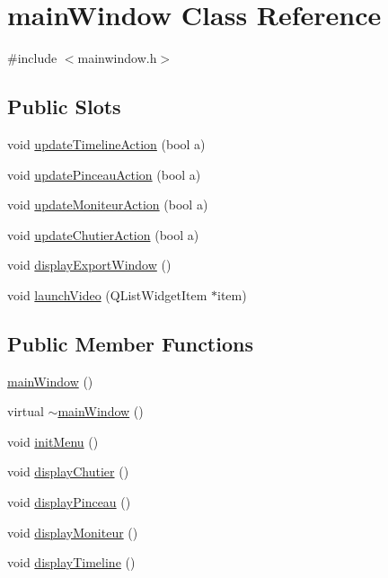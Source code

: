 \hypertarget{classmain_window}{\section{main\-Window \-Class \-Reference}
\label{classmain_window}
}


{\ttfamily \#include $<$mainwindow.\-h$>$}

\subsection*{\-Public \-Slots}
\begin{DoxyCompactItemize}
\item 
void \hyperlink{classmain_window_a1e3b0c0362c7a00799a5b5ed4383ba68}{update\-Timeline\-Action} (bool a)
\item 
void \hyperlink{classmain_window_ad2056d0c69d6c1f1a94286175ac757ae}{update\-Pinceau\-Action} (bool a)
\item 
void \hyperlink{classmain_window_a8743acd4677c3ff95abfa6fd760dab6e}{update\-Moniteur\-Action} (bool a)
\item 
void \hyperlink{classmain_window_a0afa781b310e1b1d008ec054161d6fcb}{update\-Chutier\-Action} (bool a)
\item 
void \hyperlink{classmain_window_a96c52dfe34f45eda1851e4efbbf40702}{display\-Export\-Window} ()
\item 
void \hyperlink{classmain_window_af26494a82495fa6398cb0b4a67d1e784}{launch\-Video} (\-Q\-List\-Widget\-Item $\ast$item)
\end{DoxyCompactItemize}
\subsection*{\-Public \-Member \-Functions}
\begin{DoxyCompactItemize}
\item 
\hyperlink{classmain_window_a467ea0d8090c122e5b5fd69f77ed3476}{main\-Window} ()
\item 
virtual \hyperlink{classmain_window_a2c4caa71599521dbde5bc35b230ed648}{$\sim$main\-Window} ()
\item 
void \hyperlink{classmain_window_adb3a411d0c54b5d4f080326347e7ce5e}{init\-Menu} ()
\item 
void \hyperlink{classmain_window_a7aae51e2fdfc9fc1afab53e046416140}{display\-Chutier} ()
\item 
void \hyperlink{classmain_window_a1d2a0ce69fbeff21f7eab4deaf97d767}{display\-Pinceau} ()
\item 
void \hyperlink{classmain_window_a7211fb7071fd19754a87cfff71be712e}{display\-Moniteur} ()
\item 
void \hyperlink{classmain_window_a37c7daf9d40917684830763578963112}{display\-Timeline} ()
\end{DoxyCompactItemize}


